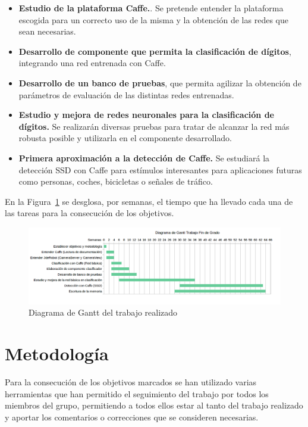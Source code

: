 \begin{itemize}
	\item \textbf{Estudio de la plataforma Caffe.}. Se pretende entender la plataforma escogida para un correcto uso de la misma y la obtención de las redes que sean necesarias.
	\item \textbf{Desarrollo de componente que permita la clasificación de dígitos}, integrando una red entrenada con Caffe.
	\item \textbf{Desarrollo de un banco de pruebas}, que permita agilizar la obtención de parámetros de evaluación de las distintas redes entrenadas.
	\item \textbf{Estudio y mejora de redes neuronales para la clasificación de dígitos.} Se realizarán diversas pruebas para tratar de alcanzar la red más robusta posible y utilizarla en el componente desarrollado.
	\item \textbf{Primera aproximación a la detección de Caffe.} Se estudiará la detección SSD con Caffe para estímulos interesantes para aplicaciones futuras como personas, coches, bicicletas o señales de tráfico.
\end{itemize}

En la Figura~\ref{fig.diagrama} se desglosa, por semanas, el tiempo que ha llevado cada una de las tareas para la consecución de los objetivos.

\begin{figure}[H]
	\begin{center}
		\includegraphics[width=1\textwidth]{figures/diagrama}
		\caption{Diagrama de Gantt del trabajo realizado}
		\label{fig.diagrama}
	\end{center}
\end{figure}

\section{Metodología}
Para la consecución de los objetivos marcados se han utilizado varias herramientas que han permitido el seguimiento del trabajo por todos los miembros del grupo, permitiendo a todos ellos estar al tanto del trabajo realizado y aportar los comentarios o correcciones que se consideren necesarias.\\

